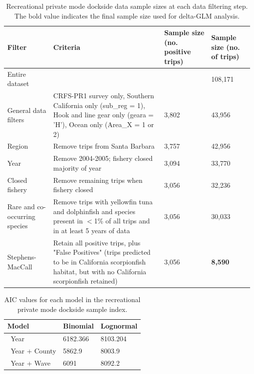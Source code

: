 \documentclass[12pt,]{article}
\begin{document}
\FloatBarrier

\begin{table}[ht]
\centering
\caption{Recreational private mode dockside data sample 
                                          sizes at each data filtering step.  
                                          The bold value indicates the final sample size 
                                          used for delta-GLM analysis.} 
\label{tab:Fleet4_RecPR_dockside_filter}
\begin{tabular}{>{\raggedright}p{1.5in}>{\raggedright}p{2.6in}>{\raggedright}p{1in}>{\raggedright}p{1in}}
  \hline
Filter & Criteria & Sample size (no. positive trips) & Sample size (no. of trips) \\ 
  \hline
Entire dataset &  &  & 108,171 \\ 
  General data filters & CRFS-PR1 survey only, Southern California only (sub\_reg = 1), Hook and line gear only (geara = 'H'), Ocean only (Area\_X = 1 or 2) & 3,802 & 43,956 \\ 
  Region & Remove trips from Santa Barbara & 3,757 & 42,956 \\ 
  Year & Remove 2004-2005; fishery closed majority of year & 3,094 & 33,770 \\ 
  Closed fishery & Remove remaining trips when fishery closed & 3,056 & 32,236 \\ 
  Rare and co-occurring species & Remove trips with yellowfin tuna and dolphinfish and species present in $<$1\% of all trips and in at least 5 years of data & 3,056 & 30,033 \\ 
  Stephens-MacCall & Retain all positive trips, plus "False Positives" (trips predicted to be in California scorpionfish habitat, but with no California scorpionfish retained) & 3,056 & \textbf{8,590} \\ 
   \hline
\end{tabular}
\end{table}\begin{table}[ht]
\centering
\caption{AIC values for each model in the
                                          recreational private mode dockside sample 
                                          index.} 
\label{tab:Fleet4_RecPR_dockside_aic}
\begin{tabular}{lll}
  \hline
Model & Binomial & Lognormal \\ 
  \hline
~Year & 6182.366 & 8103.204 \\ 
  ~Year + County & 5862.9 & 8003.9 \\ 
  ~Year + Wave & 6091 & 8092.2 \\ 

\end{tabular}
\end{table}
\end{document}
